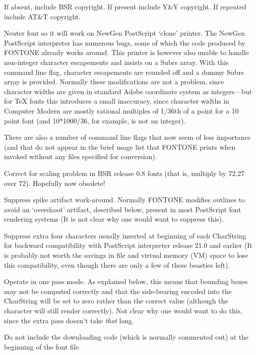  If absent, include BSR copyright.
If present include Y\&Y copyright.
If repeated include AT\&T copyright.

 Neuter font so it will work on NewGen PostScript `clone' printer.
The NewGen PostScript interpreter has numerous bugs, some of which
the code produced by FONTONE already works around. This printer is
however also unable to handle non-integer character escapements and
insists on a Subrs array.
With this command line flag, character escapements are rounded off and
a dummy Subrs array is provided.  Normally these modifications are
not a problem, since character widths are given in standard
Adobe coordinate system as integers---but for {\TeX} fonts this
introduces a small inaccuracy, since character widths in Computer
Modern are mostly rational multiples of 1/36th of a point for a 10
point font (and 10*1000/36, for example, is not an integer).

\endbullets

There are also a number of command line flags that now seem of less
importance (and that do not appear in the brief usage list that FONTONE
prints when invoked without any files specified for conversion).

\beginbullets

 Correct for scaling problem in BSR release 0.8 fonts
(that is, multiply by 72.27 over 72). Hopefully now obsolete!

 Suppress spike artifact work-around.  Normally FONTONE modifies
outlines to avoid an `overshoot' artifact, described below, present in
most PostScript font rendering systems 
(It is not clear why one would want to suppress this).

 Suppress extra four characters usually inserted at
beginning of each CharString for backward compatibility with
PostScript interpreter release 21.0 and earlier 
(It is probably not worth the savings in file and virtual memory (VM)
space to lose this compatibility, 
even though there are only a few of these beasties left). 

 Operate in one pass mode.  As explained below, this means
that bounding boxes may not be computed correctly and that the side-bearing 
encoded into the CharString will be set to zero rather than the correct
value (although the character will still render correctly). Not clear
why one would want to do this, since the extra pass doesn't take 
{\it that} long. 

 Do not include the downloading code (which is normally
commented out) at the beginning of the font file.

